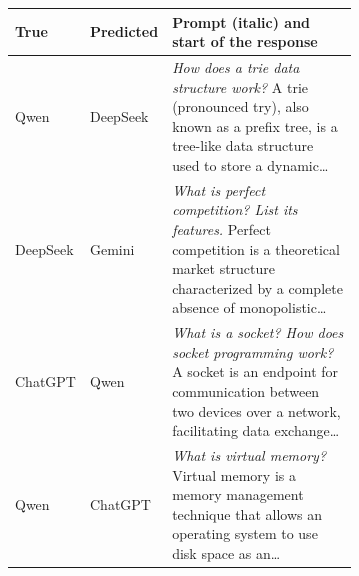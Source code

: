 \begin{tabular}{llp{0.68\linewidth}}
\toprule
True & Predicted & Prompt (italic) and start of the response \\
\midrule
Qwen & DeepSeek & \textit{How does a trie data structure work?} A trie (pronounced \textquotedbl{}try\textquotedbl{}), also known as a prefix tree, is a tree{-}like data structure used to store a dynamic\ldots \\
DeepSeek & Gemini & \textit{What is perfect competition? List its features.} Perfect competition is a theoretical market structure characterized by a complete absence of monopolistic\ldots \\
ChatGPT & Qwen & \textit{What is a socket? How does socket programming work?} A socket is an endpoint for communication between two devices over a network, facilitating data exchange\ldots \\
Qwen & ChatGPT & \textit{What is virtual memory?} Virtual memory is a memory management technique that allows an operating system to use disk space as an\ldots \\
\bottomrule
\end{tabular}
